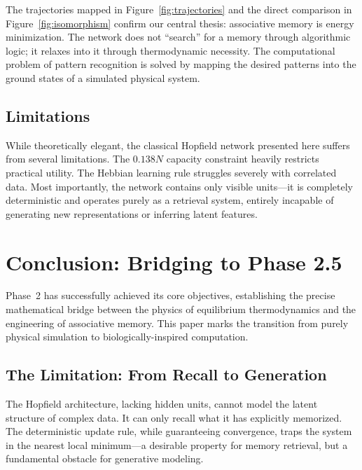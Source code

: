 \documentclass[11pt,a4paper,twocolumn]{article}
\begin{document}
The trajectories mapped in Figure~\ref{fig:trajectories} and the direct
comparison in Figure~\ref{fig:isomorphism} confirm our central thesis:
associative memory is energy minimization. The network does not ``search'' for
a memory through algorithmic logic; it relaxes into it through thermodynamic
necessity. The computational problem of pattern recognition is solved by
mapping the desired patterns into the ground states of a simulated physical
system.

\subsection{Limitations}
\label{sec:limitations}

While theoretically elegant, the classical Hopfield network presented here
suffers from several limitations. The $0.138N$ capacity constraint heavily
restricts practical utility. The Hebbian learning rule struggles severely with
correlated data. Most importantly, the network contains only visible
units---it is completely deterministic and operates purely as a retrieval
system, entirely incapable of generating new representations or inferring
latent features.

\section{Conclusion: Bridging to Phase 2.5}
\label{sec:conclusion}

Phase~2 has successfully achieved its core objectives, establishing the
precise mathematical bridge between the physics of equilibrium thermodynamics
and the engineering of associative memory. This paper marks the transition
from purely physical simulation to biologically-inspired computation.

\subsection{The Limitation: From Recall to Generation}
\label{sec:limitation_recall}

The Hopfield architecture, lacking hidden units, cannot model the latent
structure of complex data. It can only recall what it has explicitly memorized.
The deterministic update rule, while guaranteeing convergence, traps the
system in the nearest local minimum---a desirable property for memory
retrieval, but a fundamental obstacle for generative modeling.
\end{document}

